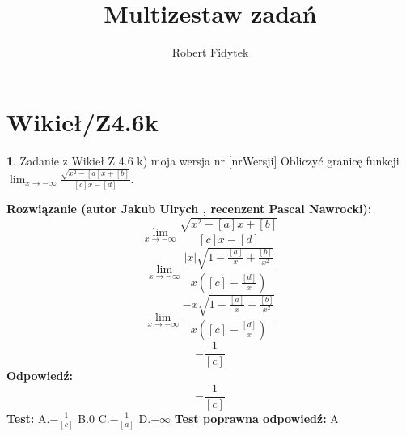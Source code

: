 \documentclass[12pt, a4paper]{article}
\title{Multizestaw zadań}
\author{Robert Fidytek}
\date{}
\theoremstyle{definition} %
\newtheorem{zad}{}
\newcommand{\kategoria}[1]{\section{#1}} %
\newcommand{\zadStart}[1]{\begin{zad}#1\newline} %
\newcommand{\zadStop}{\end{zad}}   %
\newcommand{\rozwStart}[2]{\noindent \textbf{Rozwiązanie (autor #1 , recenzent #2): }\newline} %
\newcommand{\rozwStop}{\newline}                                            %
\newcommand{\odpStart}{\noindent \textbf{Odpowiedź:}\newline}    %
\newcommand{\odpStop}{\newline}                                             %
\newcommand{\testStart}{\noindent \textbf{Test:}\newline} %
\newcommand{\testStop}{\newline} %
\newcommand{\kluczStart}{\noindent \textbf{Test poprawna odpowiedź:}\newline} %
\newcommand{\kluczStop}{\newline} %
\begin{document}
\maketitle


\kategoria{Wikieł/Z4.6k}
\zadStart{Zadanie z Wikieł Z 4.6 k) moja wersja nr [nrWersji]}
Obliczyć granicę funkcji $\lim_{x \to -\infty}\frac{\sqrt{x^{2}-[a]x+[b]}}{[c]x-[d]}$.
\zadStop
\rozwStart{Jakub Ulrych}{Pascal Nawrocki}
$$\lim_{x \to -\infty}\frac{\sqrt{x^{2}-[a]x+[b]}}{[c]x-[d]}$$
$$\lim_{x \to -\infty}\frac{|x|\sqrt{1-\frac{[a]}{x}+\frac{[b]}{x^{2}}}}{x([c]-\frac{[d]}{x})}$$
$$\lim_{x \to -\infty}\frac{-x\sqrt{1-\frac{[a]}{x}+\frac{[b]}{x^{2}}}}{x([c]-\frac{[d]}{x})}$$
$$-\frac{1}{[c]}$$
\rozwStop
\odpStart
$$-\frac{1}{[c]}$$
\odpStop
\testStart
A.$-\frac{1}{[c]}$
B.$0$
C.$-\frac{1}{[a]}$
D.$-\infty$
\testStop
\kluczStart
A
\kluczStop
\end{document}
